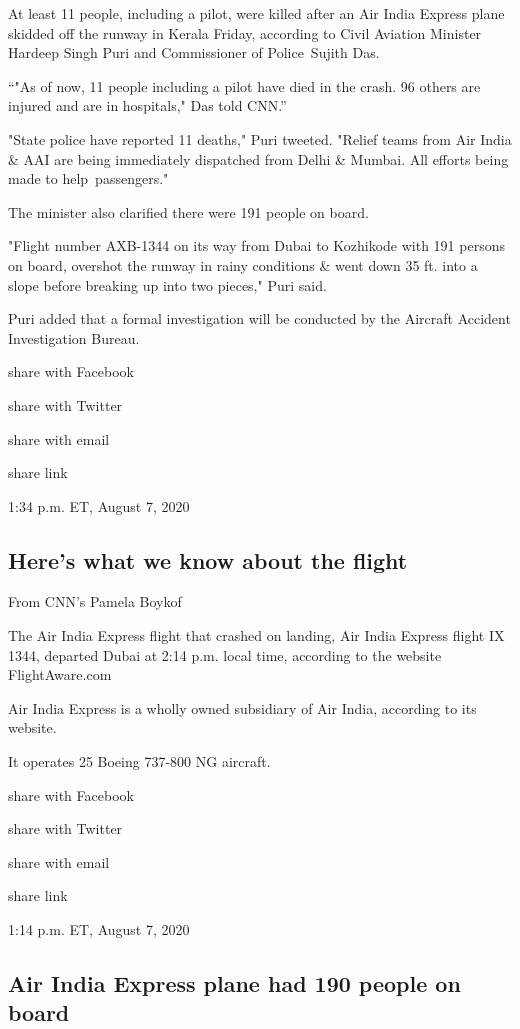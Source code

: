 At least 11 people, including a pilot, were killed after an Air India
Express plane skidded off the runway in Kerala Friday, according to
Civil Aviation Minister Hardeep Singh Puri and Commissioner of
Police~Sujith Das.

``"As of now, 11 people including a pilot have died in the crash. 96
others are injured and are in hospitals," Das told CNN.''

"State police have reported 11 deaths," Puri tweeted. "Relief teams from
Air India \& AAI are being immediately dispatched from Delhi \& Mumbai.
All efforts being made to help~passengers."

The minister also clarified there were 191 people on board.

"Flight number AXB-1344 on its way from Dubai to Kozhikode with 191
persons on board, overshot the runway in rainy conditions \& went down
35 ft. into a slope before breaking up into two pieces," Puri said.

Puri added that a formal investigation will be conducted by the Aircraft
Accident Investigation Bureau.

share with Facebook

share with Twitter

share with email

share link

1:34 p.m. ET, August 7, 2020

\hypertarget{heres-what-we-know-about-the-flight}{%
\subsection{Here's what we know about the
flight}\label{heres-what-we-know-about-the-flight}}

From CNN's Pamela Boykof

The Air India Express flight that crashed on landing, Air India Express
flight IX 1344, departed Dubai at 2:14 p.m. local time, according to the
website FlightAware.com

Air India Express is a wholly owned subsidiary of Air India, according
to its website.

It operates 25 Boeing 737-800 NG aircraft.

share with Facebook

share with Twitter

share with email

share link

1:14 p.m. ET, August 7, 2020

\hypertarget{air-india-express-plane-had-190-people-on-board}{%
\subsection{Air India Express plane had 190 people on
board}\label{air-india-express-plane-had-190-people-on-board}}

